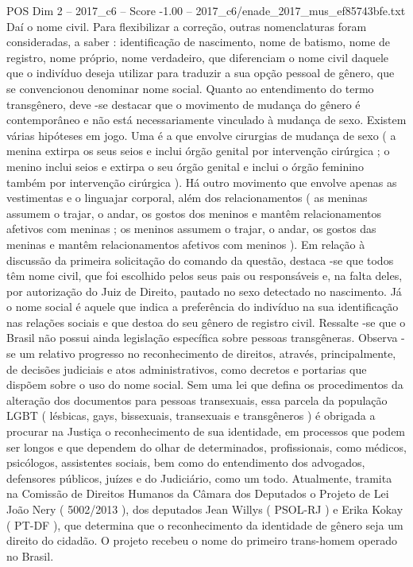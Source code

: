 \begin{textsample}{POS Dim 2 – 2017\_c6 – Score -1.00 – 2017\_c6/enade\_2017\_mus\_ef85743bfe.txt}
Daí o nome civil.
Para flexibilizar a correção, outras nomenclaturas foram consideradas, a saber : identificação de nascimento, nome de batismo, nome de registro, nome próprio, nome verdadeiro, que diferenciam o nome civil daquele que o indivíduo deseja utilizar para traduzir a sua opção pessoal de gênero, que se convencionou denominar nome social.
Quanto ao entendimento do termo transgênero, deve -se destacar que o movimento de mudança do gênero é contemporâneo e não está necessariamente vinculado à mudança de sexo.
Existem várias hipóteses em jogo.
Uma é a que envolve cirurgias de mudança de sexo ( a menina extirpa os seus seios e inclui órgão genital por intervenção cirúrgica ; o menino inclui seios e extirpa o seu órgão genital e inclui o órgão feminino também por intervenção cirúrgica ).
Há outro movimento que envolve apenas as vestimentas e o linguajar corporal, além dos relacionamentos ( as meninas assumem o trajar, o andar, os gostos dos meninos e mantêm relacionamentos afetivos com meninas ; os meninos assumem o trajar, o andar, os gostos das meninas e mantêm relacionamentos afetivos com meninos ).
Em relação à discussão da primeira solicitação do comando da questão, destaca -se que todos têm nome civil, que foi escolhido pelos seus pais ou responsáveis e, na falta deles, por autorização do Juiz de Direito, pautado no sexo detectado no nascimento.
Já o nome social é aquele que indica a preferência do indivíduo na sua identificação nas relações sociais e que destoa do seu gênero de registro civil.
Ressalte -se que o Brasil não possui ainda legislação específica sobre pessoas transgêneras.
Observa -se um relativo progresso no reconhecimento de direitos, através, principalmente, de decisões judiciais e atos administrativos, como decretos e portarias que dispõem sobre o uso do nome social.
Sem uma lei que defina os procedimentos da alteração dos documentos para pessoas transexuais, essa parcela da população LGBT ( lésbicas, gays, bissexuais, transexuais e transgêneros ) é obrigada a procurar na Justiça o reconhecimento de sua identidade, em processos que podem ser longos e que dependem do olhar de determinados, profissionais, como médicos, psicólogos, assistentes sociais, bem como do entendimento dos advogados, defensores públicos, juízes e do Judiciário, como um todo.
Atualmente, tramita na Comissão de Direitos Humanos da Câmara dos Deputados o Projeto de Lei João Nery ( 5002/2013 ), dos deputados Jean Willys ( PSOL-RJ ) e Erika Kokay ( PT-DF ), que determina que o reconhecimento da identidade de gênero seja um direito do cidadão.
O projeto recebeu o nome do primeiro trans-homem operado no Brasil.

\end{textsample}
